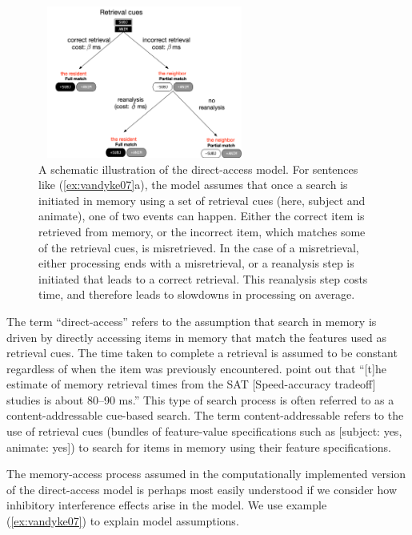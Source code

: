 \documentclass{cambridge7A}\usepackage[]{graphicx}\usepackage[]{color}
\begin{document}
\begin{figure}
\begin{center}
\includegraphics[height=5cm,width=7cm]{figures/c05DA.jpg}
\end{center}
\caption{A schematic illustration of the direct-access model. For sentences like (\ref{ex:vandyke07}a), the model assumes that once a search is initiated in memory using a set of retrieval cues (here, subject and animate), one of two events can happen. Either the correct item is retrieved from memory, or the incorrect item, which matches some of the retrieval cues, is misretrieved. In the case of a misretrieval, either processing ends with a misretrieval, or a reanalysis step is initiated that leads to a correct retrieval. This reanalysis step costs time, and therefore leads to slowdowns in processing on average.} \label{fig:da}
\end{figure}

The term ``direct-access'' refers to the assumption that search in memory is driven by directly accessing items in memory that match the features used as retrieval cues. The time taken to complete a retrieval is assumed to be constant regardless of when the item was previously encountered. \cite{LewisVasishthVanDyke2006} point out that  ``[t]he estimate of memory retrieval times from the SAT  [Speed-accuracy tradeoff] studies is about 80–90 ms.'' This type of  search process is often referred to as a content-addressable cue-based search. The term  content-addressable refers to the use of retrieval cues (bundles of feature-value specifications such as [subject: yes, animate: yes]) to search for items in memory using their feature specifications. 

The  memory-access process assumed in the computationally implemented version of the direct-access model \citep{NicenboimRetrieval2018} is perhaps most easily understood if we consider how  inhibitory interference effects arise in the model. We use example (\ref{ex:vandyke07}) to explain model assumptions.
\end{document}
